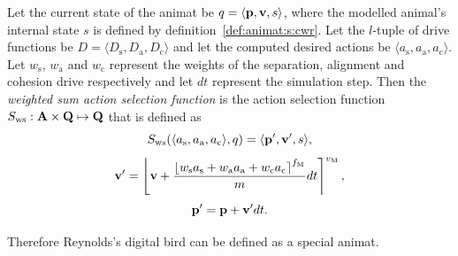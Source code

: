 \begin{defn}
\label{def:animat:Sws:cwr}
Let the current state of the animat be $q=\langle{\ensuremath{\mathbf{p}}},{\mathbf{v}},s\rangle$, where the modelled animal's internal state $s$ is defined by definition~\ref{def:animat:s:cwr}. Let the $l$-tuple of drive functions be $D=\langle D_\mathrm{s}, D_\mathrm{a}, D_\mathrm{c}\rangle$ and let the computed desired actions be $\langle a_\mathrm{s},a_\mathrm{a},a_\mathrm{c}\rangle$. Let $w_\mathrm{s}$, $w_\mathrm{a}$ and $w_\mathrm{c}$ represent the weights of the separation, alignment and cohesion drive respectively and let $dt$ represent the simulation step. Then the \emph{weighted sum action selection function} is the action selection function $S_\mathrm{ws}: {\mathbf{A}} \times {\ensuremath{\mathbf{Q}}} \mapsto {\ensuremath{\mathbf{Q}}}$ that is defined as
\begin{equation}
S_\mathrm{ws}(\langle a_\mathrm{s},a_\mathrm{a},a_\mathrm{c}\rangle, q) = \langle{\ensuremath{\mathbf{p}}}', {\mathbf{v}}', s\rangle, \label{eq:animat:Sws0:cwr}
\end{equation}
\vspace{-3mm}
\begin{equation}
{\ensuremath{\mathbf{v}}}' = \left\lfloor {{\ensuremath{\mathbf{v}}} + \frac{\left\lfloor w_\mathrm{s}a_\mathrm{s} + w_\mathrm{a}a_\mathrm{a} + w_\mathrm{c}a_\mathrm{c} \right\rceil^{f_\mathrm{M}}}{m}}dt \right\rceil^{v_\mathrm{M}},
\end{equation}
\vspace{-3mm}
\begin{equation}
{\ensuremath{\mathbf{p}}}' = {\mathbf{p}} + {\mathbf{v}}'dt. \label{eq:animat:Sws2:cwr}
\end{equation}
\end{defn}

Therefore Reynolds's digital bird can be defined as a special animat. 

